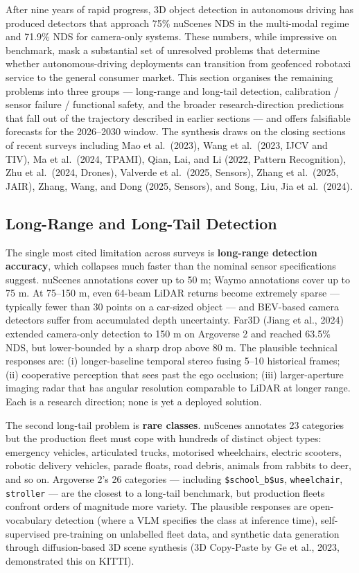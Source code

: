 After nine years of rapid progress, 3D object detection in autonomous driving has produced detectors that approach 75\% nuScenes NDS in the multi-modal regime and 71.9\% NDS for camera-only systems. These numbers, while impressive on benchmark, mask a substantial set of unresolved problems that determine whether autonomous-driving deployments can transition from geofenced robotaxi service to the general consumer market. This section organises the remaining problems into three groups --- long-range and long-tail detection, calibration / sensor failure / functional safety, and the broader research-direction predictions that fall out of the trajectory described in earlier sections --- and offers falsifiable forecasts for the 2026--2030 window. The synthesis draws on the closing sections of recent surveys including Mao et al.~(2023), Wang et al.~(2023, IJCV and TIV), Ma et al.~(2024, TPAMI), Qian, Lai, and Li (2022, Pattern Recognition), Zhu et al.~(2024, Drones), Valverde et al.~(2025, Sensors), Zhang et al.~(2025, JAIR), Zhang, Wang, and Dong (2025, Sensors), and Song, Liu, Jia et al.~(2024).

\subsection{Long-Range and Long-Tail Detection}\label{long-range-and-long-tail-detection}

The single most cited limitation across surveys is \textbf{long-range detection accuracy}, which collapses much faster than the nominal sensor specifications suggest. nuScenes annotations cover up to 50 m; Waymo annotations cover up to 75 m. At 75--150 m, even 64-beam LiDAR returns become extremely sparse --- typically fewer than 30 points on a car-sized object --- and BEV-based camera detectors suffer from accumulated depth uncertainty. Far3D (Jiang et al., 2024) extended camera-only detection to 150 m on Argoverse 2 and reached 63.5\% NDS, but lower-bounded by a sharp drop above 80 m. The plausible technical responses are: (i) longer-baseline temporal stereo fusing 5--10 historical frames; (ii) cooperative perception that sees past the ego occlusion; (iii) larger-aperture imaging radar that has angular resolution comparable to LiDAR at longer range. Each is a research direction; none is yet a deployed solution.

The second long-tail problem is \textbf{rare classes}. nuScenes annotates 23 categories but the production fleet must cope with hundreds of distinct object types: emergency vehicles, articulated trucks, motorised wheelchairs, electric scooters, robotic delivery vehicles, parade floats, road debris, animals from rabbits to deer, and so on. Argoverse 2's 26 categories --- including \texttt{\$school\_b\$us}, \texttt{wheelchair}, \texttt{stroller} --- are the closest to a long-tail benchmark, but production fleets confront orders of magnitude more variety. The plausible responses are open-vocabulary detection (where a VLM specifies the class at inference time), self-supervised pre-training on unlabelled fleet data, and synthetic data generation through diffusion-based 3D scene synthesis (3D Copy-Paste by Ge et al., 2023, demonstrated this on KITTI).

